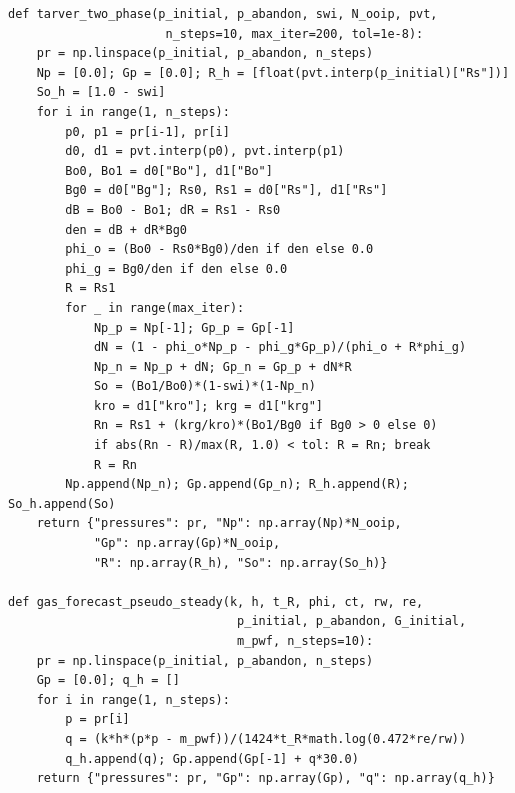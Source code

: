 \documentclass[10pt,a4paper,openany]{book}
\begin{document}
\begin{lstlisting}
def tarver_two_phase(p_initial, p_abandon, swi, N_ooip, pvt,
                      n_steps=10, max_iter=200, tol=1e-8):
    pr = np.linspace(p_initial, p_abandon, n_steps)
    Np = [0.0]; Gp = [0.0]; R_h = [float(pvt.interp(p_initial)["Rs"])]
    So_h = [1.0 - swi]
    for i in range(1, n_steps):
        p0, p1 = pr[i-1], pr[i]
        d0, d1 = pvt.interp(p0), pvt.interp(p1)
        Bo0, Bo1 = d0["Bo"], d1["Bo"]
        Bg0 = d0["Bg"]; Rs0, Rs1 = d0["Rs"], d1["Rs"]
        dB = Bo0 - Bo1; dR = Rs1 - Rs0
        den = dB + dR*Bg0
        phi_o = (Bo0 - Rs0*Bg0)/den if den else 0.0
        phi_g = Bg0/den if den else 0.0
        R = Rs1
        for _ in range(max_iter):
            Np_p = Np[-1]; Gp_p = Gp[-1]
            dN = (1 - phi_o*Np_p - phi_g*Gp_p)/(phi_o + R*phi_g)
            Np_n = Np_p + dN; Gp_n = Gp_p + dN*R
            So = (Bo1/Bo0)*(1-swi)*(1-Np_n)
            kro = d1["kro"]; krg = d1["krg"]
            Rn = Rs1 + (krg/kro)*(Bo1/Bg0 if Bg0 > 0 else 0)
            if abs(Rn - R)/max(R, 1.0) < tol: R = Rn; break
            R = Rn
        Np.append(Np_n); Gp.append(Gp_n); R_h.append(R); So_h.append(So)
    return {"pressures": pr, "Np": np.array(Np)*N_ooip,
            "Gp": np.array(Gp)*N_ooip,
            "R": np.array(R_h), "So": np.array(So_h)}

def gas_forecast_pseudo_steady(k, h, t_R, phi, ct, rw, re,
                                p_initial, p_abandon, G_initial,
                                m_pwf, n_steps=10):
    pr = np.linspace(p_initial, p_abandon, n_steps)
    Gp = [0.0]; q_h = []
    for i in range(1, n_steps):
        p = pr[i]
        q = (k*h*(p*p - m_pwf))/(1424*t_R*math.log(0.472*re/rw))
        q_h.append(q); Gp.append(Gp[-1] + q*30.0)
    return {"pressures": pr, "Gp": np.array(Gp), "q": np.array(q_h)}
\end{lstlisting}
\end{document}
